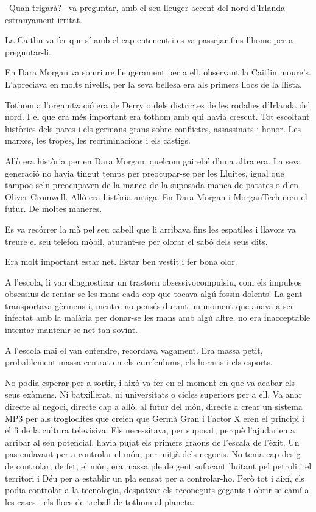 --Quan trigarà? --va preguntar, amb el seu lleuger accent del nord
d'Irlanda estranyament irritat.

La Caitlin va fer que sí amb el cap entenent i es va passejar fins
l'home per a preguntar-li.

En Dara Morgan va somriure lleugerament per a ell, observant la Caitlin
moure's. L'apreciava en molts nivells, per la seva bellesa era als
primers llocs de la llista.

Tothom a l'organització era de Derry o dels districtes de les rodalies
d'Irlanda del nord. I el que era més important era tothom amb qui havia
crescut. Tot escoltant històries dels pares i els germans grans sobre
conflictes, assassinats i honor. Les marxes, les tropes, les
recriminacions i els càstigs.

Allò era història per en Dara Morgan, quelcom gairebé d'una altra era.
La seva generació no havia tingut temps per preocupar-se per les
Lluites, igual que tampoc se'n preocupaven de la manca de la suposada
manca de patates o d'en Oliver Cromwell. Allò era història antiga. En
Dara Morgan i MorganTech eren el futur. De moltes maneres.

Es va recórrer la mà pel seu cabell que li arribava fins les espatlles i
llavors va treure el seu telèfon mòbil, aturant-se per olorar el sabó
dels seus dits.

Era molt important estar net. Estar ben vestit i fer bona olor.

A l'escola, li van diagnosticar un trastorn obsessivocompulsiu, com els
impulsos obsessius de rentar-se les mans cada cop que tocava algú fossin
dolents! La gent transportava gèrmens i, mentre no pensés durant un
moment que anava a ser infectat amb la malària per donar-se les mans amb
algú altre, no era inacceptable intentar mantenir-se net tan sovint.

A l'escola mai el van entendre, recordava vagament. Era massa petit,
probablement massa centrat en els currículums, els horaris i els
esports.

No podia esperar per a sortir, i això va fer en el moment en que va
acabar els seus exàmens. Ni batxillerat, ni universitats o cicles
superiors per a ell. Va anar directe al negoci, directe cap a allò, al
futur del món, directe a crear un sistema MP3 per als troglodites que
creien que Germà Gran i Factor X eren el principi i el fi de la cultura
televisiva. Els necessitava, per suposat, perquè l'ajudarien a arribar
al seu potencial, havia pujat els primers graons de l'escala de l'èxit.
Un pas endavant per a controlar el món, per mitjà dels negocis. No tenia
cap desig de controlar, de fet, el món, era massa ple de gent sufocant
lluitant pel petroli i el territori i Déu per a establir un pla sensat
per a controlar-ho. Però tot i així, els podia controlar a la
tecnologia, despatxar els reconeguts gegants i obrir-se camí a les cases
i els llocs de treball de tothom al planeta.


